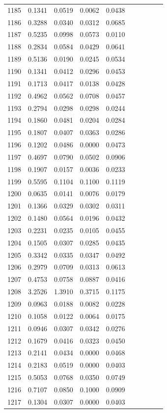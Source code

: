 \begin{table}
\begin{tabular}{cccccccccc}
1185& 0.1341& 0.0519& 0.0062& 0.0438\\ 
1186& 0.3288& 0.0340& 0.0312& 0.0685\\ 
1187& 0.5235& 0.0998& 0.0573& 0.0110\\ 
1188& 0.2834& 0.0584& 0.0429& 0.0641\\ 
1189& 0.5136& 0.0190& 0.0245& 0.0534\\ 
1190& 0.1341& 0.0412& 0.0296& 0.0453\\ 
1191& 0.1713& 0.0417& 0.0138& 0.0428\\ 
1192& 0.4962& 0.0562& 0.0708& 0.0457\\ 
1193& 0.2794& 0.0298& 0.0298& 0.0244\\ 
1194& 0.1860& 0.0481& 0.0204& 0.0284\\ 
1195& 0.1807& 0.0407& 0.0363& 0.0286\\ 
1196& 0.1202& 0.0486& 0.0000& 0.0473\\ 
1197& 0.4697& 0.0790& 0.0502& 0.0906\\ 
1198& 0.1907& 0.0157& 0.0036& 0.0233\\ 
1199& 0.5595& 0.1104& 0.1100& 0.1119\\ 
1200& 0.0635& 0.0141& 0.0076& 0.0179\\ 
1201& 0.1366& 0.0329& 0.0302& 0.0311\\ 
1202& 0.1480& 0.0564& 0.0196& 0.0432\\ 
1203& 0.2231& 0.0235& 0.0105& 0.0455\\ 
1204& 0.1505& 0.0307& 0.0285& 0.0435\\ 
1205& 0.3342& 0.0335& 0.0347& 0.0492\\ 
1206& 0.2979& 0.0709& 0.0313& 0.0613\\ 
1207& 0.4753& 0.0758& 0.0887& 0.0416\\ 
1208& 3.2526& 1.3910& 0.3715& 0.1175\\ 
1209& 0.0963& 0.0188& 0.0082& 0.0228\\ 
1210& 0.1058& 0.0122& 0.0064& 0.0175\\ 
1211& 0.0946& 0.0307& 0.0342& 0.0276\\ 
1212& 0.1679& 0.0416& 0.0323& 0.0450\\ 
1213& 0.2141& 0.0434& 0.0000& 0.0468\\ 
1214& 0.2183& 0.0519& 0.0000& 0.0403\\ 
1215& 0.5053& 0.0768& 0.0350& 0.0749\\ 
1216& 0.7107& 0.0850& 0.1000& 0.0909\\ 
1217& 0.1304& 0.0307& 0.0000& 0.0403\\ 

\end{tabular}
\end{table}
